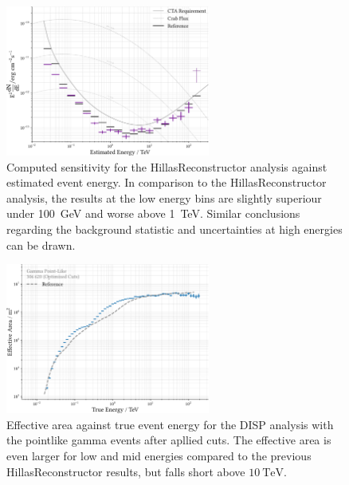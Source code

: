 \begin{figure}
    \centering
    \captionsetup{width=0.9\linewidth}
    \includegraphics[width=0.6\textwidth]{../analysis/plots/sensitivity/disp_sensitivity.pdf} 
    \caption{Computed sensitivity for the HillasReconstructor analysis against estimated event energy.
    In comparison to the HillasReconstructor analysis, the results at the low energy bins are slightly
    superiour under \SI{100}{\giga\electronvolt} and worse
    above \SI{1}{\tera\electronvolt}.
    Similar conclusions regarding the background statistic and uncertainties
    at high energies can be drawn.}
    \label{fig:disp_sens}
\end{figure}

\begin{figure}
    \centering
    \captionsetup{width=0.9\linewidth}
    \includegraphics[width=0.6\textwidth]{../analysis/plots/sensitivity/disp_effective_area.pdf} 
    \caption{Effective area against true event energy for the DISP analysis
    with the pointlike gamma events after apllied cuts.
    The effective area is even larger for low and mid energies compared 
    to the previous HillasReconstructor results, but falls short above
    $\SI{10}{\tera\electronvolt}$.}
    \label{fig:disp_area}
\end{figure}

